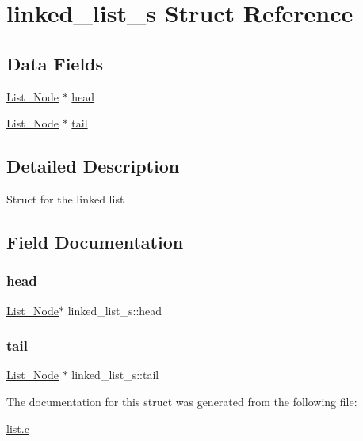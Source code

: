 \hypertarget{structlinked__list__s}{}\section{linked\+\_\+list\+\_\+s Struct Reference}
\label{structlinked__list__s}
\subsection*{Data Fields}
\begin{DoxyCompactItemize}
\item 
\mbox{\hyperlink{list_8h_a541ea301c0b5aedcd24808db52ba1036}{List\+\_\+\+Node}} $\ast$ \mbox{\hyperlink{structlinked__list__s_a761bfc29041398b7aec0e2591b3d43e1}{head}}
\item 
\mbox{\hyperlink{list_8h_a541ea301c0b5aedcd24808db52ba1036}{List\+\_\+\+Node}} $\ast$ \mbox{\hyperlink{structlinked__list__s_af1b419dcc3abf3281d49bf094471f566}{tail}}
\end{DoxyCompactItemize}


\subsection{Detailed Description}
Struct for the linked list 

\subsection{Field Documentation}
\mbox{\label{structlinked__list__s_a761bfc29041398b7aec0e2591b3d43e1}} 
\subsubsection{\texorpdfstring{head}{head}}
{\footnotesize\ttfamily \mbox{\hyperlink{list_8h_a541ea301c0b5aedcd24808db52ba1036}{List\+\_\+\+Node}}$\ast$ linked\+\_\+list\+\_\+s\+::head}

\mbox{\label{structlinked__list__s_af1b419dcc3abf3281d49bf094471f566}} 
\subsubsection{\texorpdfstring{tail}{tail}}
{\footnotesize\ttfamily \mbox{\hyperlink{list_8h_a541ea301c0b5aedcd24808db52ba1036}{List\+\_\+\+Node}} $\ast$ linked\+\_\+list\+\_\+s\+::tail}



The documentation for this struct was generated from the following file\+:\begin{DoxyCompactItemize}
\item 
\mbox{\hyperlink{list_8c}{list.\+c}}\end{DoxyCompactItemize}
